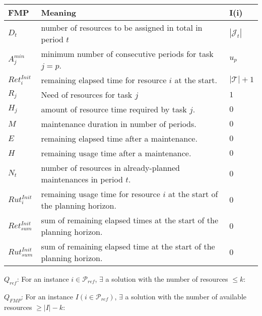 \documentclass[a4paper,11pt]{article}
\begin{document}
    \begin{tabular}{l|l|l}
    	\textbf{FMP}    &  \textbf{Meaning} & \textbf{I(i)} \\ \hline
        $D_t$            & number of resources to be assigned in total in period $t$ & $|\mathcal{J}_t|$\\
        $A^{min}_j$      & minimum number of consecutive periods for task $j=p$. & $u_p$ \\
        $Ret^{Init}_{i}$ & remaining elapsed time for resource $i$ at the start. & $|\mathcal{T}| + 1$ \\
        $R_{j}$          & Need of resources for task $j$ & $1$ \\
        $H_j$             & amount of resource time required by task $j$. & $ 0$ \\
        $M$               & maintenance duration in number of periods. & $ 0$ \\
        $E$               & remaining elapsed time after a maintenance. & $ 0$ \\
        $H$               & remaining usage time after a maintenance.& $ 0$ \\
        $N_t$             & number of resources in already-planned maintenances in period $t$. & $0$ \\
        $Rut^{Init}_{i}$  & remaining usage time for resource $i$ at the start of the planning horizon. & $ 0$ \\
        $Ret^{Init}_{sum}$& sum of remaining elapsed times at the start of the planning horizon. & $ 0$\\
        $Rut^{Init}_{sum}$& sum of remaining elapsed time at the start of the planning horizon. & $ 0$ \\
    \end{tabular}

$Q_{ref}$: For an instance $i \in \mathcal{P}_{ref}$, $\exists$ a solution with the number of resources $\leq k$:

$Q_{FMP}$: For an instance $I(i \in \mathcal{P}_{ref})$, $\exists$ a solution with the number of available resources $\geq |I| - k$:


\clearpage



% 


\end{document}
